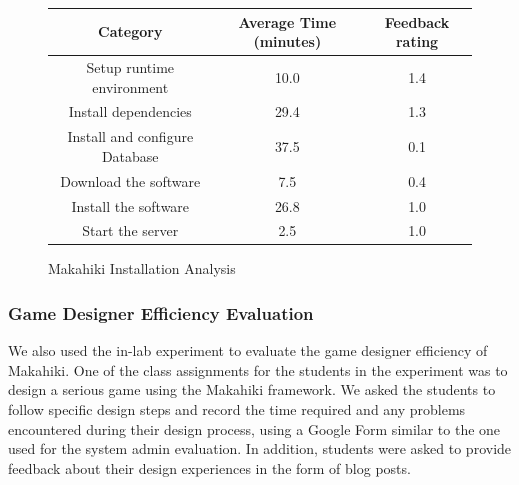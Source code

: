 \documentclass{sigchi}
\newcommand\tabhead[1]{\small\textbf{#1}}
\begin{document}
\begin{figure}[ht!]
  \centering
  \begin{tabular}{|c|c|c|}
    \hline
    \multicolumn{1}{|p{0.5\columnwidth}|}{\centering\tabhead{Category}} &
    \multicolumn{1}{|p{0.2\columnwidth}|}{\centering\tabhead{Average Time (minutes)}} &
    \multicolumn{1}{|p{0.2\columnwidth}|}{\centering\tabhead{Feedback rating}} \\
    \hline
    \multicolumn{1}{|p{0.5\columnwidth}|}{Setup runtime environment} &
    \multicolumn{1}{|p{0.2\columnwidth}|}{10.0} &
    \multicolumn{1}{|p{0.2\columnwidth}|}{1.4} \\
    \hline
    \multicolumn{1}{|p{0.5\columnwidth}|}{Install dependencies} &
    \multicolumn{1}{|p{0.2\columnwidth}|}{29.4} &
    \multicolumn{1}{|p{0.2\columnwidth}|}{1.3} \\
    \hline
    \multicolumn{1}{|p{0.5\columnwidth}|}{Install and configure Database} &
    \multicolumn{1}{|p{0.2\columnwidth}|}{37.5} &
    \multicolumn{1}{|p{0.2\columnwidth}|}{0.1} \\
    \hline
    \multicolumn{1}{|p{0.5\columnwidth}|}{Download the software} &
    \multicolumn{1}{|p{0.2\columnwidth}|}{7.5} &
    \multicolumn{1}{|p{0.2\columnwidth}|}{0.4} \\
    \hline
    \multicolumn{1}{|p{0.5\columnwidth}|}{Install the software} &
    \multicolumn{1}{|p{0.2\columnwidth}|}{26.8} &
    \multicolumn{1}{|p{0.2\columnwidth}|}{1.0} \\
    \hline
    \multicolumn{1}{|p{0.5\columnwidth}|}{Start the server} &
    \multicolumn{1}{|p{0.2\columnwidth}|}{2.5} &
    \multicolumn{1}{|p{0.2\columnwidth}|}{1.0} \\
    \hline
  \end{tabular}
  \caption{Makahiki Installation Analysis}
  \label{fig:makahiki-install}
\end{figure}

\subsubsection{Game Designer Efficiency Evaluation}

We also used the in-lab experiment to evaluate the game
designer efficiency of Makahiki. One of the class assignments for the students in the
experiment was to design a serious game using the Makahiki framework. We asked the students
to follow specific design steps and record the time required and any problems encountered during
their design process, using a Google Form similar to the one used for the system admin
evaluation. In addition, students were asked to provide feedback about their
design experiences in the form of blog posts.
\end{document}
